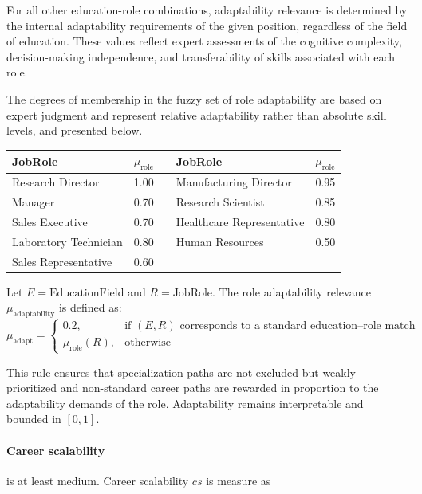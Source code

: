\documentclass[runningheads]{llncs}
\begin{document}
For all other education-role combinations, adaptability relevance is determined by the internal adaptability requirements of the given position, regardless of the field of education. These values reflect expert assessments of the cognitive complexity, decision-making independence, and transferability of skills associated with each role. 

The degrees of membership in the fuzzy set of role adaptability are based on expert judgment and represent relative adaptability rather than absolute skill levels, and presented below.

\begin{table}[h]
\centering
\label{tab:role_adaptability}
\begin{tabular}{|l|c c|l|c|}
\hline
JobRole & $\mu_{\text{role}}$ &\hspace{1.3cm}& JobRole & $\mu_{\text{role}}$\\
\hline
Research Director & 1.00 && Manufacturing Director & 0.95 \\
\hline
Manager & 0.70 && Research Scientist & 0.85 \\
\hline
Sales Executive & 0.70 && Healthcare Representative & 0.80 \\
\hline
Laboratory Technician & 0.80 && Human Resources & 0.50 \\
\hline
Sales Representative & 0.60 && & \\
\hline
\end{tabular}
\end{table}


Let \(E = \text{EducationField}\) and \(R = \text{JobRole}\).  
The role adaptability relevance \(\mu_{\text{adaptability}}\) is defined as:
\[
\mu_{\text{adapt}} =
\begin{cases}
0.2, & \text{if } (E,R) \text{ corresponds to a standard education--role match} \\
\mu_{\text{role}}(R), & \text{otherwise}
\end{cases}
\]

This rule ensures that specialization paths are not excluded but weakly prioritized and non-standard career paths are rewarded in proportion to the adaptability demands of the role. Adaptability remains interpretable and bounded in \([0,1]\).

\paragraph{Career scalability}is at least medium. Career scalability $cs$ is measure as\\
\vspace{-1.5em}
\begin{center} 
\end{center}
    
\end{document}
